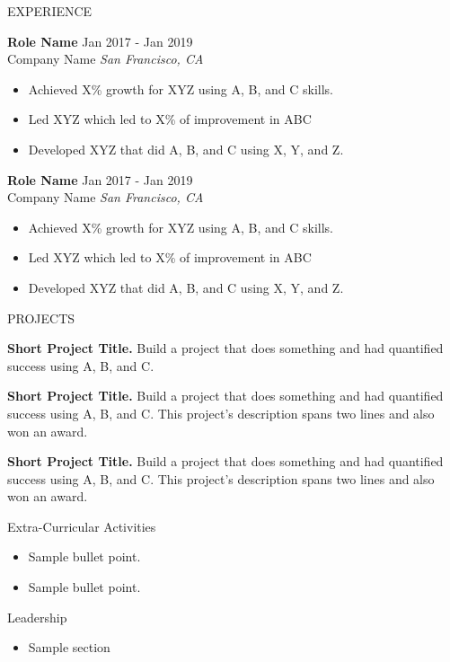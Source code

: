 \documentclass{resume} %
\begin{document}
\begin{rSection}{EXPERIENCE}

\textbf{Role Name} \hfill Jan 2017 - Jan 2019\\
Company Name \hfill \textit{San Francisco, CA}
 \begin{itemize}
    \itemsep -3pt {} 
     \item Achieved X\% growth for XYZ using A, B, and C skills.
     \item Led XYZ which led to X\% of improvement in ABC
    \item Developed XYZ that did A, B, and C using X, Y, and Z. 
 \end{itemize}
 
\textbf{Role Name} \hfill Jan 2017 - Jan 2019\\
Company Name \hfill \textit{San Francisco, CA}
 \begin{itemize}
    \itemsep -3pt {} 
     \item Achieved X\% growth for XYZ using A, B, and C skills.
     \item Led XYZ which led to X\% of improvement in ABC
    \item Developed XYZ that did A, B, and C using X, Y, and Z. 
 \end{itemize}

\end{rSection} 


\begin{rSection}{PROJECTS}
\vspace{-1.25em}
\item \textbf{Short Project Title.} {Build a project that does something and had quantified success using A, B, and C.}
\item \textbf{Short Project Title.} {Build a project that does something and had quantified success using A, B, and C. This project's description spans two lines and also won an award.}
\item \textbf{Short Project Title.} {Build a project that does something and had quantified success using A, B, and C. This project's description spans two lines and also won an award.}
\end{rSection} 

\begin{rSection}{Extra-Curricular Activities} 
\begin{itemize}
    \item 	Sample bullet point.
    \item	Sample bullet point.
\end{itemize}


\end{rSection}

\begin{rSection}{Leadership} 
\begin{itemize}
    \item Sample section
\end{itemize}


\end{rSection}
\end{document}

